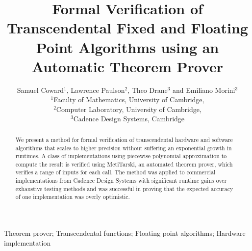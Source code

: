 \documentclass{fac}
\title[Transcendental Verification using Theorem Proving]{Formal Verification of Transcendental Fixed and Floating Point Algorithms using an Automatic Theorem Prover}
\author[Samuel Coward]
    {Samuel Coward$^1$, Lawrence Paulson$^2$, Theo Drane$^3$ and Emiliano Morini$^3$\\
     $^1$Faculty of Mathematics, University of Cambridge,\\
     $^2$Computer Laboratory, University of Cambridge,\\
     $^3$Cadence Design Systems, Cambridge\\}
\begin{document}
\label{firstpage}

\makecorrespond

\maketitle

\begin{abstract}
We present a method for formal verification of transcendental hardware and software algorithms that scales to higher precision without suffering an exponential growth in runtimes. A class of implementations using piecewise polynomial approximation to compute the result is verified using MetiTarski, an automated theorem prover, which verifies a range of inputs for each call. The method was applied to commercial implementations from Cadence Design Systems with significant runtime gains over exhaustive testing methods and was successful in proving that the expected accuracy of one implementation was overly optimistic.
\end{abstract}
\begin{keywords}Theorem prover; Transcendental functions; Floating point algorithms; Hardware implementation
\end{keywords}

\end{document}
